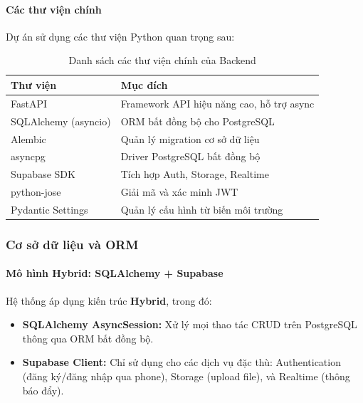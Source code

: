 \documentclass[a4paper,12pt]{article}
\begin{document}
\paragraph{Các thư viện chính}

Dự án sử dụng các thư viện Python quan trọng sau:

\begin{table}[H]
    \centering
    \begin{tabularx}{\textwidth}{|l|X|}
    \hline
    \textbf{Thư viện} & \textbf{Mục đích} \\
    \hline
    FastAPI & Framework API hiệu năng cao, hỗ trợ async \\
    \hline
    SQLAlchemy (asyncio) & ORM bất đồng bộ cho PostgreSQL \\
    \hline
    Alembic & Quản lý migration cơ sở dữ liệu \\
    \hline
    asyncpg & Driver PostgreSQL bất đồng bộ \\
    \hline
    Supabase SDK & Tích hợp Auth, Storage, Realtime \\
    \hline
    python-jose & Giải mã và xác minh JWT \\
    \hline
    Pydantic Settings & Quản lý cấu hình từ biến môi trường \\
    \hline
    \end{tabularx}
    \caption{Danh sách các thư viện chính của Backend}
\end{table}

\subsubsection{Cơ sở dữ liệu và ORM}

\paragraph{Mô hình Hybrid: SQLAlchemy + Supabase}

Hệ thống áp dụng kiến trúc \textbf{Hybrid}, trong đó:
\begin{itemize}
    \item \textbf{SQLAlchemy AsyncSession:} Xử lý mọi thao tác CRUD trên PostgreSQL thông qua ORM bất đồng bộ.
    \item \textbf{Supabase Client:} Chỉ sử dụng cho các dịch vụ đặc thù: Authentication (đăng ký/đăng nhập qua phone), Storage (upload file), và Realtime (thông báo đẩy).
\end{itemize}
\end{document}
